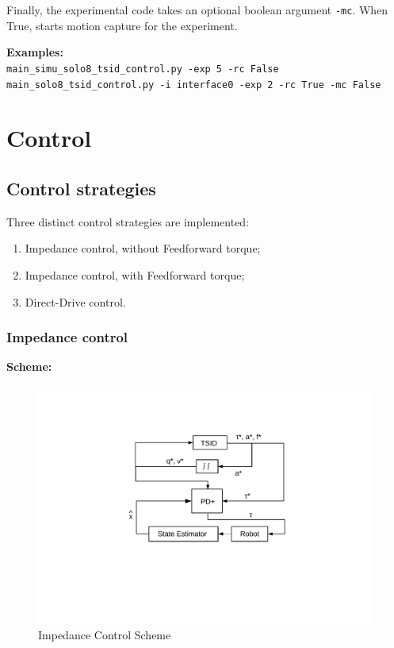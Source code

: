\documentclass[12pt,a4paper]{article}
\begin{document}
Finally, the experimental code takes an optional boolean argument \texttt{-mc}. When True, starts motion capture for the experiment. \newline

\textbf{Examples:} \\
\texttt{main\_simu\_solo8\_tsid\_control.py -exp 5 -rc False} \\
\texttt{main\_solo8\_tsid\_control.py -i interface0 -exp 2 -rc True -mc False}

\section{Control}

\subsection{Control strategies}

Three distinct control strategies are implemented: 
\begin{enumerate}
    \item Impedance control, without Feedforward torque;
    \item Impedance control, with Feedforward torque;
    \item Direct-Drive control.
\end{enumerate}


\subsubsection{Impedance control}

\textbf{Scheme:} \\

\begin{figure}[ht]
    \centering
    \includegraphics[width=.8\textwidth, trim = 200 180 180 120, clip]{Pics/IC_scheme.pdf}
    \caption{Impedance Control Scheme}
    \label{fig:ic_scheme}
\end{figure}
\end{document}
